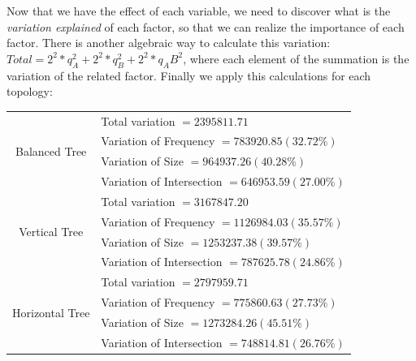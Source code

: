 Now that we have the effect of each variable, we need to discover what is the \emph{variation explained} of each factor, so that we can realize the importance of each factor. There is another algebraic way to calculate this variation: $Total = 2^2 * q _A ^2 + 2^2 * q _B ^2 + 2^2 * q _AB ^2  $, where each element of the summation is the variation of the related factor. Finally we apply this calculations for each topology:

\begin{center}
	\begin{tabular}{ | c | l | }
		\hline
		\multirow{4}{*}{Balanced Tree}& Total variation $= 2395811.71$ \\
		                              & Variation of Frequency $= 783920.85 (32.72\%)$ \\
		                              & Variation of Size $= 964937.26  (40.28\%)$ \\
		                              & Variation of Intersection $= 646953.59 (27.00\%)$\\
		
		\hline
		\multirow{4}{*}{Vertical Tree} & Total variation $= 3167847.20$ \\
		                               & Variation of Frequency $= 1126984.03 (35.57\%)$ \\
		                               & Variation of Size $= 1253237.38 (39.57\%)$ \\
		                               & Variation of Intersection $= 787625.78 (24.86\%)$\\ 
		
		\hline
		\multirow{4}{*}{Horizontal Tree} & Total variation $= 2797959.71$ \\
		                                 & Variation of Frequency $= 775860.63 (27.73\%)$ \\
		                                 & Variation of Size $= 1273284.26 (45.51\%)$ \\
		                                 & Variation of Intersection $= 748814.81 (26.76\%)$\\
		\hline
	\end{tabular}
\end{center}

